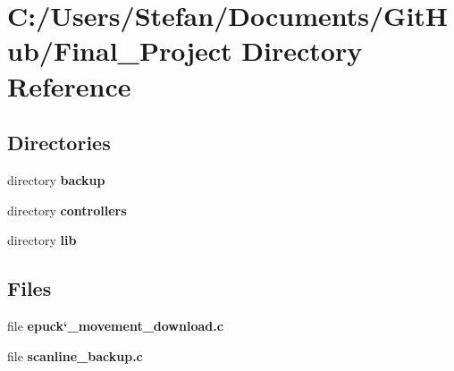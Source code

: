 \section{C\-:/\-Users/\-Stefan/\-Documents/\-Git\-Hub/\-Final\-\_\-\-Project Directory Reference}
\label{dir_7bc185f2187b03eb2cbb1036f8f66b71}
\subsection*{Directories}
\begin{DoxyCompactItemize}
\item 
directory {\bf backup}
\item 
directory {\bf controllers}
\item 
directory {\bf lib}
\end{DoxyCompactItemize}
\subsection*{Files}
\begin{DoxyCompactItemize}
\item 
file {\bf epuck`\-\_\-movement\-\_\-download.\-c}
\item 
file {\bf scanline\-\_\-backup.\-c}
\end{DoxyCompactItemize}
